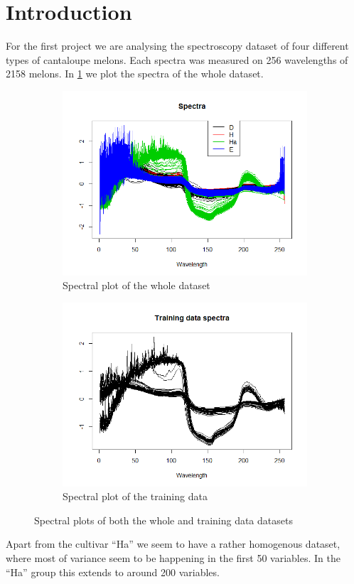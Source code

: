 \documentclass[12pt]{article}
\begin{document}
\section{Introduction}
For the first project we are analysing the spectroscopy dataset of four different types of cantaloupe melons. Each spectra was measured on 256 wavelengths of 2158 melons.
In \ref{fig:spectra} we plot the spectra of the whole dataset.
\begin{figure}[h!]
    \begin{subfigure}[b]{0.5\linewidth}
        \centering
        \includegraphics[width=\textwidth]{../images/spectra.png}
     \caption{Spectral plot of the whole dataset}\label{fig:spectra}
    \end{subfigure}%
    \begin{subfigure}[b]{0.5\linewidth}
        \centering
     \includegraphics[width=\textwidth]{../images/trainDataSpectra.png}
     \caption{Spectral plot of the training data}\label{fig:trainDataSpectra}
    \end{subfigure}%
   \caption{Spectral plots of both the whole and training data datasets}
\end{figure}
Apart from the cultivar ``Ha'' we seem to have a rather homogenous dataset, where most of variance seem to be happening in the first 50 variables. In the ``Ha'' group this 
extends to around 200 variables.
\end{document}
